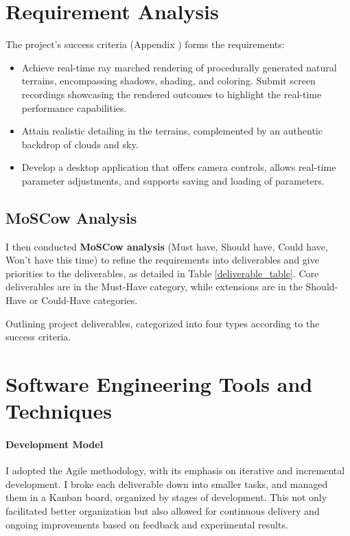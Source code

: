 \section{Requirement Analysis}
\label{sec:Requirement}

The project’s success criteria (Appendix ) forms the requirements:

\begin{itemize}
    \item Achieve real-time ray marched rendering of procedurally generated natural terrains, encompassing shadows, shading, and coloring. Submit screen recordings showcasing the rendered outcomes to highlight the real-time performance capabilities.
    \item Attain realistic detailing in the terrains, complemented by an authentic backdrop of clouds and sky.
    \item Develop a desktop application that offers camera controls, allows real-time parameter adjustments, and supports saving and loading of parameters.
\end{itemize}

\subsection{MoSCow Analysis}

I then conducted \textbf{MoSCow analysis} (Must have, Should have, Could have, Won't have this time) to refine the requirements into deliverables and give priorities to the deliverables, as detailed in Table \ref{deliverable_table}. Core deliverables are in the Must-Have category, while extensions are in the Should-Have or Could-Have categories. 

{Outlining project deliverables, categorized into four types according to the success criteria.}

\section{Software Engineering Tools and Techniques}
\label{sec:Software Engineering}

\paragraph{Development Model}
I adopted the Agile methodology, with its emphasis on iterative and incremental development. I broke each deliverable down into smaller tasks, and managed them in a Kanban board, organized by stages of development. This not only facilitated better organization but also allowed for continuous delivery and ongoing improvements based on feedback and experimental results.

